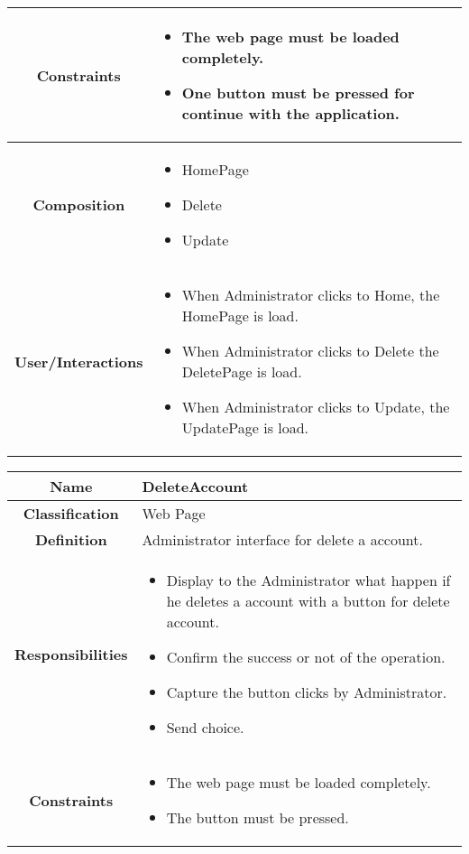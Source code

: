 \documentclass[11pt, a4paper,titlepage]{article}
\begin{document}
\begin{enumerate}
\begin{tabularx}{\textwidth}{| c | X |}
	\hline
	\textbf{Constraints} &
	\begin{itemize}
		\item  The web page must be loaded completely.
		\item One button must be pressed for continue with the application.
	\end{itemize}
	\\
	\hline
	\textbf{Composition} &
	\begin{itemize}
		\item HomePage
		\item Delete
		\item Update
	\end{itemize}
	\\
	\hline
	\textbf{User/Interactions} &
	\begin{itemize}
		\item When Administrator clicks to Home, the HomePage is load.    	
		\item When Administrator clicks to Delete the DeletePage is load.    	
		\item When Administrator clicks to Update, the UpdatePage is load.
	\end{itemize}
	\\
	\hline 
\end{tabularx}
\begin{tabularx}{\textwidth}{| c | X |}
	\hline
	\textbf{Name} &
	DeleteAccount
	\\
	\hline
	\textbf{Classification} &
	Web Page
	\\
	\hline
	\textbf{Definition} &
	Administrator interface for delete a account.\\
	\hline
	\textbf{Responsibilities} &
	\begin{itemize}
		\item Display to the Administrator what happen if he deletes a account with a button for delete account.
		\item Confirm the success or not of the operation.
		\item Capture the button clicks by Administrator.
		\item Send choice.
	\end{itemize}
	\\
	\hline
	\textbf{Constraints} &
	\begin{itemize}
		\item  The web page must be loaded completely.
		\item The button must be pressed.
	\end{itemize}

\end{tabularx}
\end{enumerate}
\end{document}
